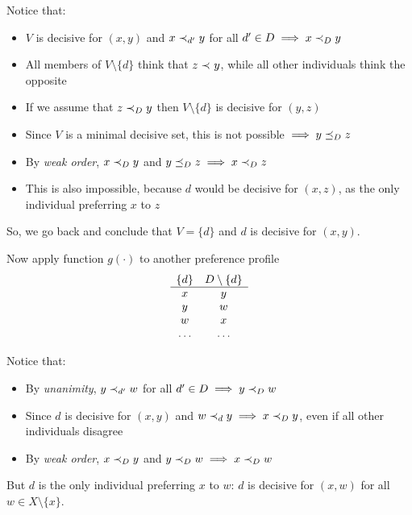 Notice that: 
\begin{itemize}
	\item $V$ is decisive for $(x,y)$ and $x \prec_{d'} y$ for all $d' \in D \implies x \prec_{D} y$
	
	\item All members of $V \setminus \{d\}$ think that $z \prec_{} y$, while all other individuals think the opposite
	
	\item If we assume that $z \prec_{D} y$ then $V \setminus \{d\}$ is decisive for $(y, z)$
	
	\item Since $V$ is a minimal decisive set, this is not possible $\implies y \preceq_{D} z$
	
	\item By \textit{weak order}, $x \prec_{D} y$ and $y \preceq_{D} z \implies x \prec_{D} z$
	
	\item This is also impossible, because $d$ would be decisive for $(x, z)$, as the only individual preferring $x$ to $z$
\end{itemize}

So, we go back and conclude that $V = \{d\}$ and $d$ is decisive for $(x, y)$.

Now apply function $g (\cdot)$ to another preference profile 
$$
\begin{array}{c c}
	\{d\} & D \setminus \{d\} \\
	\hline
	x & y \\
	y & w \\
	w & x \\
	\dots & \dots
\end{array}
$$

Notice that: 
\begin{itemize}
	\item By \textit{unanimity}, $y \prec_{d'} w$ for all $d' \in D \implies y \prec_{D} w$
	
	\item Since $d$ is decisive for $(x,y)$ and $w \prec_{d} y \implies x \prec_{D} y$, even if all other individuals disagree
	
	\item By \textit{weak order}, $x \prec_{D} y$ and $y \prec_{D} w \implies x \prec_{D} w$
\end{itemize}

But $d$ is the only individual preferring $x$ to $w$: $d$ is decisive for $(x, w)$ for all $w \in X \setminus \{x\}$.

